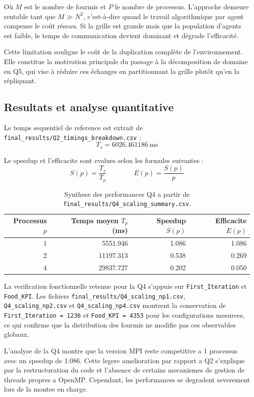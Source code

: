 \documentclass[11pt,a4paper]{article}
\begin{document}
Où $M$ est le nombre de fourmis et $P$ le nombre de processus. L'approche demeure rentable tant que $M \gg N^2$, c'est-à-dire quand le travail algorithmique par agent compense le coût réseau. Si la grille est grande mais que la population d'agents est faible, le temps de communication devient dominant et dégrade l'efficacité.

Cette limitation souligne le coût de la duplication complète de l'environnement. Elle constitue la motivation principale du passage à la décomposition de domaine en Q5, qui vise à réduire ces échanges en partitionnant la grille plutôt qu'en la répliquant.
\subsection{Resultats et analyse quantitative}

Le temps sequentiel de reference est extrait de \texttt{final\_results/Q2\_timings\_breakdown.csv} :
\[
T_s = 6026.461186\ \text{ms}
\]

Le speedup et l'efficacite sont evalues selon les formules suivantes :
\[
S(p) = \frac{T_s}{T_p} \qquad\qquad E(p) = \frac{S(p)}{p}
\]

\begin{table}[H]
  \centering
  \small
  \caption{Synthese des performances Q4 a partir de \texttt{final\_results/Q4\_scaling\_summary.csv}.}
  \label{tab:q4-scaling}
  \begin{tabular}{@{}rrrr@{}}
    \toprule
    Processus \(p\) & Temps moyen \(T_p\) (ms) & Speedup \(S(p)\) & Efficacite \(E(p)\) \\
    \midrule
    1 & 5551.946 & 1.086 & 1.086 \\
    2 & 11197.313 & 0.538 & 0.269 \\
    4 & 29837.727 & 0.202 & 0.050 \\
    \bottomrule
  \end{tabular}
\end{table}

La verification fonctionnelle retenue pour la Q4 s'appuie sur \texttt{First\_Iteration} et \texttt{Food\_KPI}. Les fichiers \texttt{final\_results/Q4\_scaling\_np1.csv}, \texttt{Q4\_scaling\_np2.csv} et \texttt{Q4\_scaling\_np4.csv} montrent la conservation de \texttt{First\_Iteration = 1236} et \texttt{Food\_KPI = 4353} pour les configurations mesurees, ce qui confirme que la distribution des fourmis ne modifie pas ces observables globaux.

L'analyse de la Q4 montre que la version MPI reste competitive a 1 processus avec un speedup de 1.086. Cette legere amelioration par rapport a Q2 s'explique par la restructuration du code et l'absence de certains mecanismes de gestion de threads propres a OpenMP. Cependant, les performances se degradent severement lors de la montee en charge.
\end{document}
